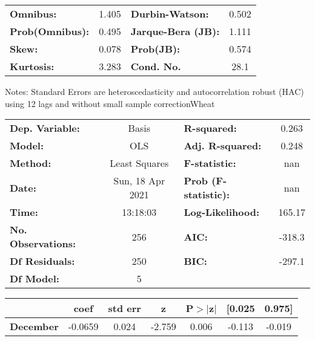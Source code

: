 \begin{center}
\begin{tabular}{lcccccc}
\bottomrule
\end{tabular}
\begin{tabular}{lclc}
\textbf{Omnibus:}       &  1.405 & \textbf{  Durbin-Watson:     } &    0.502  \\
\textbf{Prob(Omnibus):} &  0.495 & \textbf{  Jarque-Bera (JB):  } &    1.111  \\
\textbf{Skew:}          &  0.078 & \textbf{  Prob(JB):          } &    0.574  \\
\textbf{Kurtosis:}      &  3.283 & \textbf{  Cond. No.          } &     28.1  \\
\bottomrule
\end{tabular}
\end{center}

Notes: \newline
 [1] Standard Errors are heteroscedasticity and autocorrelation robust (HAC) using 12 lags and without small sample correctionWheat\begin{center}
\begin{tabular}{lclc}
\toprule
\textbf{Dep. Variable:}    &      Basis       & \textbf{  R-squared:         } &     0.263   \\
\textbf{Model:}            &       OLS        & \textbf{  Adj. R-squared:    } &     0.248   \\
\textbf{Method:}           &  Least Squares   & \textbf{  F-statistic:       } &       nan   \\
\textbf{Date:}             & Sun, 18 Apr 2021 & \textbf{  Prob (F-statistic):} &      nan    \\
\textbf{Time:}             &     13:18:03     & \textbf{  Log-Likelihood:    } &    165.17   \\
\textbf{No. Observations:} &         256      & \textbf{  AIC:               } &    -318.3   \\
\textbf{Df Residuals:}     &         250      & \textbf{  BIC:               } &    -297.1   \\
\textbf{Df Model:}         &           5      & \textbf{                     } &             \\
\bottomrule
\end{tabular}
\begin{tabular}{lcccccc}
                   & \textbf{coef} & \textbf{std err} & \textbf{z} & \textbf{P$> |$z$|$} & \textbf{[0.025} & \textbf{0.975]}  \\
\midrule
\textbf{December}  &      -0.0659  &        0.024     &    -2.759  &         0.006        &       -0.113    &       -0.019     \\

\end{tabular}
\end{center}
